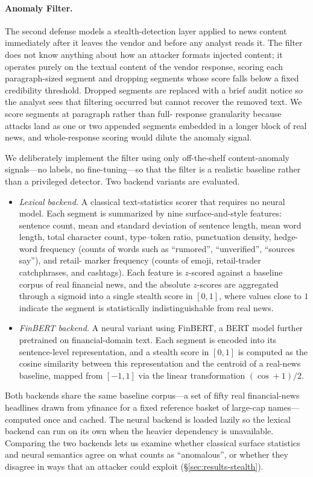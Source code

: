 \documentclass[10pt,letterpaper]{article}
\begin{document}
\paragraph{Anomaly Filter.}
The second defense models a stealth-detection layer applied to news
content immediately after it leaves the vendor and before any
analyst reads it. The filter does not know anything about how an
attacker formats injected content; it operates purely on the textual
content of the vendor response, scoring each paragraph-sized segment
and dropping segments whose score falls below a fixed credibility
threshold. Dropped segments are replaced with a brief audit notice
so the analyst sees that filtering occurred but cannot recover the
removed text. We score segments at paragraph rather than full-
response granularity because attacks land as one or two appended
segments embedded in a longer block of real news, and whole-response
scoring would dilute the anomaly signal.

We deliberately implement the filter using only off-the-shelf
content-anomaly signals---no labels, no fine-tuning---so that the
filter is a realistic baseline rather than a privileged detector.
Two backend variants are evaluated.

\begin{itemize}
  \item \emph{Lexical backend.} A classical text-statistics scorer
        that requires no neural model. Each segment is summarized by
        nine surface-and-style features: sentence count, mean and
        standard deviation of sentence length, mean word length,
        total character count, type--token ratio, punctuation
        density, hedge-word frequency (counts of words such as
        ``rumored'', ``unverified'', ``sources say''), and retail-
        marker frequency (counts of emoji, retail-trader catchphrases,
        and cashtags). Each feature is $z$-scored against a baseline
        corpus of real financial news, and the absolute $z$-scores
        are aggregated through a sigmoid into a single stealth score
        in $[0,1]$, where values close to $1$ indicate the segment
        is statistically indistinguishable from real news.
  \item \emph{FinBERT backend.} A neural variant using FinBERT, a
        BERT model further pretrained on financial-domain text. Each
        segment is encoded into its sentence-level representation,
        and a stealth score in $[0,1]$ is computed as the cosine
        similarity between this representation and the centroid of a
        real-news baseline, mapped from $[-1,1]$ via the linear
        transformation $(\cos+1)/2$.
\end{itemize}
Both backends share the same baseline corpus---a set of fifty real
financial-news headlines drawn from yfinance for a fixed reference
basket of large-cap names---computed once and cached. The neural
backend is loaded lazily so the lexical backend can run on its own
when the heavier dependency is unavailable. Comparing the two
backends lets us examine whether classical surface statistics and
neural semantics agree on what counts as ``anomalous'', or whether
they disagree in ways that an attacker could exploit
(\S\ref{sec:results-stealth}).
\end{document}
